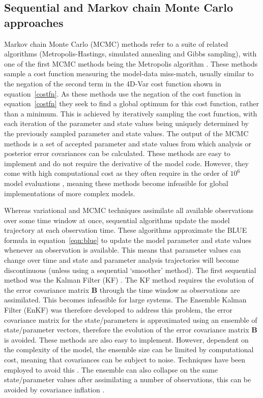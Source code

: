 \subsection{Sequential and Markov chain Monte Carlo approaches} \label{sec:mcmc_seq}

Markov chain Monte Carlo (MCMC) methods refer to a suite of related algorithms (Metropolis-Hastings, simulated annealing and Gibbs sampling), with one of the first MCMC methods being the Metropolis algorithm \citep{metropolis1953equation}. These methods sample a cost function measuring the model-data miss-match, usually similar to the negation of the second term in the 4D-Var cost function shown in equation~\eqref{costfn}. As these methods use the negation of the cost function in equation~\eqref{costfn} they seek to find a global optimum for this cost function, rather than a minimum. This is achieved by iteratively sampling the cost function, with each iteration of the parameter and state values being uniquely determined by the previously sampled parameter and state values. The output of the MCMC methods is a set of accepted parameter and state values from which analysis or posterior error covariances can be calculated. These methods are easy to implement and do not require the derivative of the model code. However, they come with high computational cost as they often require in the order of \(10^{6}\) model evaluations \citep{zobitz2011primer}, meaning these methods become infeasible for global implementations of more complex models. 

Whereas variational and MCMC techniques assimilate all available observations over some time window at once, sequential algorithms update the model trajectory at each observation time. These algorithms approximate the BLUE formula in equation~\eqref{eqn:blue} to update the model parameter and state values whenever an observation is available. This means that parameter values can change over time and state and parameter analysis trajectories will become discontinuous (unless using a sequential `smoother' method). The first sequential method was the Kalman Filter (KF) \citep{kalman1960}. The KF method requires the evolution of the error covariance matrix \textbf{B} through the time window as observations are assimilated. This becomes infeasible for large systems. The Ensemble Kalman Filter (EnKF) \citep{Evensen2003} was therefore developed to address this problem, the error covariance matrix for the state/parameters is approximated using an ensemble of state/parameter vectors, therefore the evolution of the error covariance matrix \textbf{B} is avoided. These methods are also easy to implement. However, dependent on the complexity of the model, the ensemble size can be limited by computational cost, meaning that covariances can be subject to noise. Techniques have been employed to avoid this \citep{Hamill2001}. The ensemble can also collapse on the same state/parameter values after assimilating a number of observations, this can be avoided by covariance inflation \citep{andersonandanderson1999}. 


